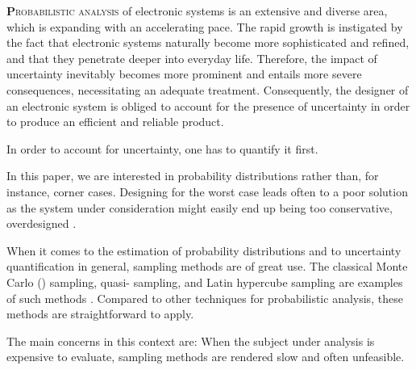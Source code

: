 \lettrine[findent=0.4em, nindent=0em]{\textbf{P}}{robabilistic analysis} of
electronic systems is an extensive and diverse area, which is expanding with an
accelerating pace. The rapid growth is instigated by the fact that electronic
systems naturally become more sophisticated and refined, and that they penetrate
deeper into everyday life. Therefore, the impact of uncertainty inevitably
becomes more prominent and entails more severe consequences, necessitating an
adequate treatment. Consequently, the designer of an electronic system is
obliged to account for the presence of uncertainty in order to produce an
efficient and reliable product.

In order to account for uncertainty, one has to quantify it first. 

 In this paper, we are interested in
probability distributions rather than, for instance, corner cases. Designing for
the worst case leads often to a poor solution as the system under consideration
might easily end up being too conservative, overdesigned \cite{quinton2012}.

When it comes to the estimation of probability distributions and to uncertainty
quantification in general, sampling methods are of great use. The classical
Monte Carlo () sampling, quasi- sampling, and Latin hypercube
sampling are examples of such methods \cite{asmussen2007}. Compared to other
techniques for probabilistic analysis, these methods are straightforward to
apply. 

 The main concerns in this context are:  When the subject under
analysis is expensive to evaluate, sampling methods are rendered slow and often
unfeasible.

